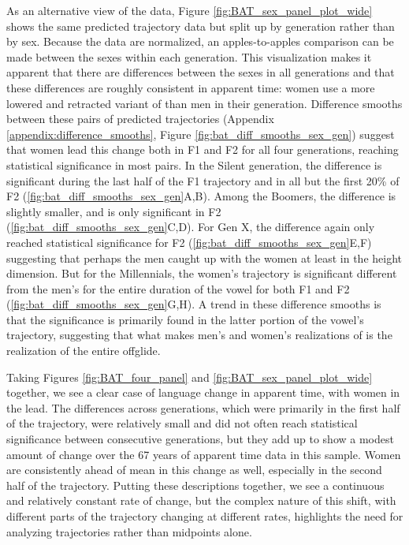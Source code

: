 As an alternative view of the data, Figure \ref{fig:BAT_sex_panel_plot_wide} shows the same predicted trajectory data but split up by generation rather than by sex. Because the data are normalized, an apples-to-apples comparison can be made between the sexes within each generation. This visualization makes it apparent that there are differences between the sexes in all generations and that these differences are roughly consistent in apparent time: women use a more lowered and retracted variant of \bat than men in their generation. Difference smooths between these pairs of predicted trajectories (Appendix \ref{appendix:difference_smooths}, Figure \ref{fig:bat_diff_smooths_sex_gen}) suggest that women lead this change both in F1 and F2 for all four generations, reaching statistical significance in most pairs. In the Silent generation, the difference is significant during the last half of the F1 trajectory and in all but the first 20\% of F2 (\ref{fig:bat_diff_smooths_sex_gen}A,B). Among the Boomers, the difference is slightly smaller, and is only significant in F2 (\ref{fig:bat_diff_smooths_sex_gen}C,D). For Gen X, the difference again only reached statistical significance for F2 (\ref{fig:bat_diff_smooths_sex_gen}E,F) suggesting that perhaps the men caught up with the women at least in the height dimension. But for the Millennials, the women's trajectory is significant different from the men's for the entire duration of the vowel for both F1 and F2 (\ref{fig:bat_diff_smooths_sex_gen}G,H). A trend in these difference smooths is that the significance is primarily found in the latter portion of the vowel's trajectory, suggesting that what makes men's and women's realizations of \bat is the realization of the entire offglide.

Taking Figures \ref{fig:BAT_four_panel} and \ref{fig:BAT_sex_panel_plot_wide} together, we see a clear case of language change in apparent time, with women in the lead. The differences across generations, which were primarily in the first half of the trajectory, were relatively small and did not often reach statistical significance between consecutive generations, but they add up to show a modest amount of change over the 67 years of apparent time data in this sample. Women are consistently ahead of mean in this change as well, especially in the second half of the trajectory. Putting these descriptions together, we see a continuous and relatively constant rate of change, but the complex nature of this shift, with different parts of the trajectory changing at different rates, highlights the need for analyzing trajectories rather than midpoints alone.


